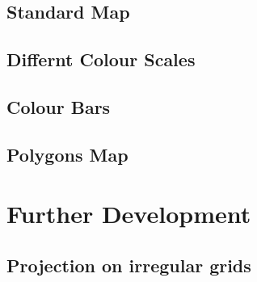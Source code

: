 \documentclass[a4paper,10pt]{article}
\begin{document}
\subsection{Standard Map}
\subsection{Differnt Colour Scales}
\subsection{Colour Bars}
\subsection{Polygons Map}
\section{Further Development}
\subsection{Projection on irregular grids}
\end{document}
